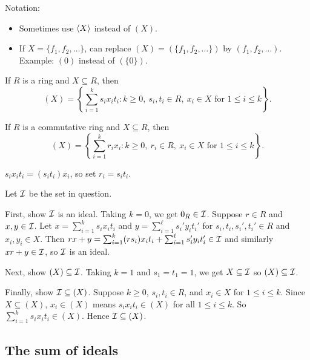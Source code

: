 \documentclass[12pt,letterpaper]{report}
\begin{document}
Notation:
\begin{itemize}
  \item Sometimes use $\langle X\rangle$ instead of $(X)$.
  \item If $X = \{f_1, f_2, \ldots\}$, can replace $(X) = (\{f_1, f_2, \ldots\})$ by
    $(f_1, f_2, \ldots)$.
    Example: $(0)$ instead of $(\{0\})$.
\end{itemize}

\begin{prop}{}{}
  If $R$ is a ring and $X \subseteq R$, then
  \[
    (X) = \left\{ \sum_{i = 1}^k s_i x_i t_i : k \geq 0, \ s_i, t_i \in R, \ x_i \in X
      \text{ for } 1 \leq i \leq k \right\}.
  \]
\end{prop}

\begin{cor}{}{}
  If $R$ is a commutative ring and $X \subseteq R$, then
  \[
    (X) = \left\{ \sum_{i = 1}^k r_i x_i : k \geq 0, \ r_i \in R, \ x_i \in X
      \text{ for } 1 \leq i \leq k \right\}.
  \]
\end{cor}

\begin{thmproof}
  $s_i x_i t_i = (s_i t_i) x_i$, so set $r_i = s_i t_i$.
\end{thmproof}

\begin{thmproof}
  Let $\mathcal{I}$ be the set in question.

  First, show $\mathcal{I}$ is an ideal.
  Taking $k = 0$, we get $0_R \in \mathcal{I}$.
  Suppose $r \in R$ and $x, y \in \mathcal{I}$.
  Let $x = \sum_{i = 1}^k s_i x_i t_i$ and $y = \sum_{i = 1}^\ell s_i' y_i t_i'$ for
  $s_i, t_i, s_i', t_i' \in R$ and $x_i, y_i \in X$.
  Then $rx + y = \sum_{i = 1}^k (rs_i) x_i t_i + \sum_{i = 1}^\ell s_i' y_i t_i' \in \mathcal{I}$ and
  similarly $xr + y \in \mathcal{I}$, so $\mathcal{I}$ is an ideal.

  Next, show $(X) \subseteq \mathcal{I}$.
  Taking $k = 1$ and $s_1 = t_1 = 1$, we get $X \subseteq \mathcal{I}$ so $(X) \subseteq \mathcal{I}$.

  Finally, show $\mathcal{I} \subseteq (X)$.
  Suppose $k \geq 0$, $s_i, t_i \in R$, and $x_i \in X$ for $1 \leq i \leq k$.
  Since $X \subseteq (X)$, $x_i \in (X)$ means $s_i x_i t_i \in (X)$ for all $1 \leq i \leq k$.
  So $\sum_{i = 1}^k s_i x_i t_i \in (X)$.
  Hence $\mathcal{I} \subseteq (X)$.
\end{thmproof}

\pagebreak
\subsection{The sum of ideals}
\end{document}

